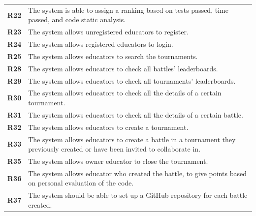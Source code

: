\documentclass[12pt, a4paper]{report}
\begin{document}
\begin{table}[H]
\begin{tabularx}{\textwidth}{cX}
        \textbf{R22}  & The system is able to assign a ranking based on tests passed, time passed, and code static analysis.                            \\
        \textbf{R23}  & The system allows unregistered educators to register.                                                                           \\
        \textbf{R24}  & The system allows registered educators to login.                                                                                \\
        \textbf{R25}  & The system allows educators to search the tournaments.                                                                          \\
        \textbf{R28}  & The system allows educators to check all battles' leaderboards.                                                                 \\
        \textbf{R29}  & The system allows educators to check all tournaments' leaderboards.                                                             \\
        \textbf{R30}  & The system allows educators to check all the details of a certain tournament.                                                   \\
        \textbf{R31}  & The system allows educators to check all the details of a certain battle.                                                       \\
        \textbf{R32}  & The system allows educators to create a tournament.                                                                             \\
        \textbf{R33}  & The system allows educators to create a battle in a tournament they previously created or have been invited to collaborate in.  \\
        \textbf{R35}  & The system allows owner educator to close the tournament.                                                                       \\
        \textbf{R36}  & The system allows educator who created the battle, to give points based on personal evaluation of the code.                     \\
        \textbf{R37}  & The system should be able to set up a GitHub repository for each battle created.                                                \\
    \end{tabularx}
    \end{table}
\end{document}
